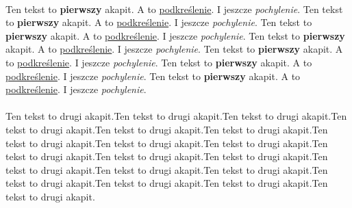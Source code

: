 \vspace{0.5 cm}

\paragraph{}
Ten tekst to \textbf{pierwszy} akapit. A to \underline{podkreślenie}. I jeszcze \textit{pochylenie}. Ten tekst to \textbf{pierwszy} akapit. A to \underline{podkreślenie}. I jeszcze \textit{pochylenie}. Ten tekst to \textbf{pierwszy} akapit. A to \underline{podkreślenie}. I jeszcze \textit{pochylenie}. Ten tekst to \textbf{pierwszy} akapit. A to \underline{podkreślenie}. I jeszcze \textit{pochylenie}. Ten tekst to \textbf{pierwszy} akapit. A to \underline{podkreślenie}. I jeszcze \textit{pochylenie}. Ten tekst to \textbf{pierwszy} akapit. A to \underline{podkreślenie}. I jeszcze \textit{pochylenie}. Ten tekst to \textbf{pierwszy} akapit. A to \underline{podkreślenie}. I jeszcze \textit{pochylenie}.
\paragraph{}
Ten tekst to drugi akapit.Ten tekst to drugi akapit.Ten tekst to drugi akapit.Ten tekst to drugi akapit.Ten tekst to drugi akapit.Ten tekst to drugi akapit.Ten tekst to drugi akapit.Ten tekst to drugi akapit.Ten tekst to drugi akapit.Ten tekst to drugi akapit.Ten tekst to drugi akapit.Ten tekst to drugi akapit.Ten tekst to drugi akapit.Ten tekst to drugi akapit.Ten tekst to drugi akapit.Ten tekst to drugi akapit.Ten tekst to drugi akapit.Ten tekst to drugi akapit.Ten tekst to drugi akapit.


